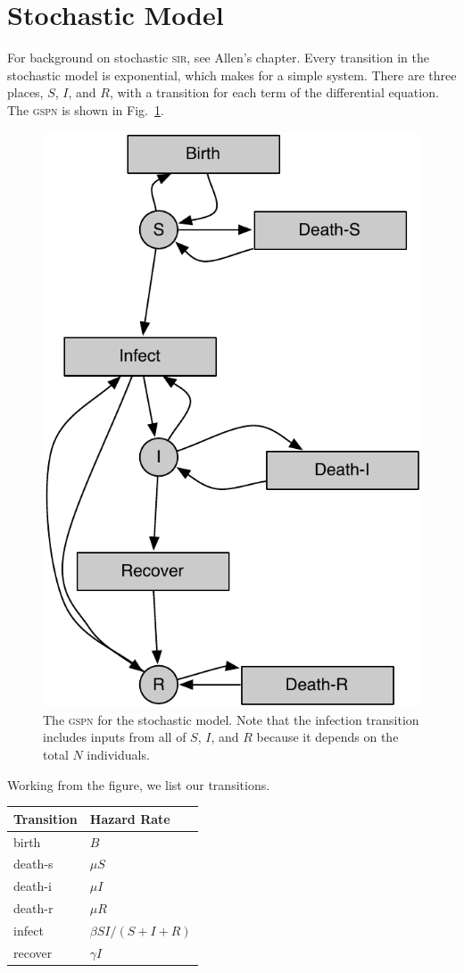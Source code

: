 \documentclass{article}
\newcommand{\sir}{\textsc{sir}\xspace}
\newcommand{\gspn}{\textsc{gspn}\xspace}
\begin{document}
\section{Stochastic Model}
For background on stochastic \sir, see Allen's chapter\cite{Allen:2008ma}.
Every transition in the stochastic model is exponential, which makes for
a simple system. There are three places, $S$, $I$, and $R$, with a transition
for each term of the differential equation. The \gspn is shown in Fig.~\ref{fig:sirgspn}.
\begin{figure}
\centerline{\includegraphics[scale=0.35]{sirexpgspn}}
\caption{The \gspn for the stochastic model. Note that the infection
transition includes inputs from all of $S$, $I$, and $R$ because it depends
on the total $N$ individuals.\label{fig:sirgspn}}
\end{figure}
Working from the figure, we list our transitions. \\
\begin{tabular}{ll}
  \hline
  Transition & Hazard Rate \\
  \hline
  birth & $B$ \\
  death-s & $\mu S$ \\
  death-i & $\mu I$ \\
  death-r & $\mu R$ \\
  infect & $\beta SI/(S+I+R)$ \\
  recover & $\gamma I$ \\
  \hline
\end{tabular}
\end{document}
